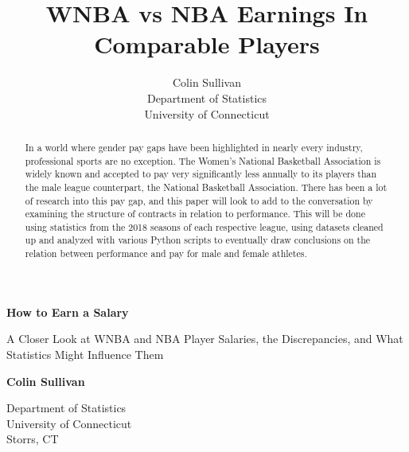 \documentclass[12pt]{article}
\title{WNBA vs NBA Earnings In Comparable Players}
\author{Colin Sullivan\\
  Department of Statistics\\
  University of Connecticut
}
\begin{document}
   \begin{center}
       \vspace*{1cm}
       \Huge
       \textbf{How to Earn a Salary}

       \Large
       \vspace{0.5cm}
        A Closer Look at WNBA and NBA Player Salaries, the Discrepancies, and What Statistics Might Influence Them
            
       \vspace{1.5cm}

       \textbf{Colin Sullivan}
       
       \vfill


       \vfill
            
            
       \vspace{0.8cm}
     
         
        \Large    
       Department of Statistics\\
       University of Connecticut\\
       Storrs, CT\\
            
   \end{center}
\newpage

\begin{abstract}
In a world where gender pay gaps have been highlighted in nearly every industry, professional sports are no exception. The Women’s National Basketball 
Association is widely known and accepted to pay very significantly less annually to its players than the male league counterpart, the National Basketball 
Association. There has been a lot of research into this pay gap, and this paper will look to add to the conversation by examining the structure of 
contracts in relation to performance. This will be done using statistics from the 2018 seasons of each respective league, using datasets cleaned up and 
analyzed with various Python scripts to eventually draw conclusions on the relation between performance and pay for male and female athletes.	
\end{abstract}
\end{document}
